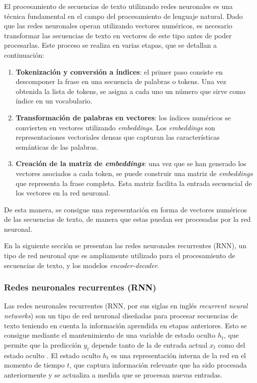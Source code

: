 \documentclass[11pt,spanish,listoffigures,listoftables]{tfgetsinf}
\begin{document}

El procesamiento de secuencias de texto utilizando redes neuronales es una técnica fundamental en el campo del procesamiento de lenguaje natural. Dado que las redes neuronales operan utilizando vectores numéricos, es necesario transformar las secuencias de texto en vectores de este tipo antes de poder procesarlas. Este proceso se realiza en varias etapas, que se detallan a continuación:

\begin{enumerate}
	\item \textbf{Tokenización y conversión a índices}: el primer paso consiste en descomponer la frase en una secuencia de palabras o tokens. Una vez obtenida la lista de tokens, se asigna a cada uno un número que sirve como índice en un vocabulario.
	\item \textbf{Transformación de palabras en vectores}: los índices numéricos se convierten en vectores utilizando \textit{embeddings}. Los \textit{embeddings} son representaciones vectoriales densas que capturan las características semánticas de las palabras.
	\item \textbf{Creación de la matriz de \textit{embeddings}}: una vez que se han generado los vectores asociados a cada token, se puede construir una matriz de \textit{embeddings} que representa la frase completa. Esta matriz facilita la entrada secuencial de los vectores en la red neuronal.
\end{enumerate}

De esta manera, se consigue una representación en forma de vectores numéricos de las secuencias de texto, de manera que estas puedan ser procesadas por la red neuronal.

En la siguiente sección se presentan las redes neuronales recurrentes (RNN), un tipo de red neuronal que es ampliamente utilizado para el procesamiento de secuencias de texto, y los modelos \textit{encoder-decoder}.

\subsubsection{Redes neuronales recurrentes (RNN)} \label{rnn}
Las redes neuronales recurrentes (RNN, por sus siglas en inglés \textit{recurrent neural networks}) son un tipo de red neuronal diseñadas para procesar secuencias de texto teniendo en cuenta la información aprendida en etapas anteriores. Esto se consigue mediante el mantenimiento de una variable de estado oculto $h_t$, que permite que la predicción $y_t$ depende tanto de la de entrada actual $x_t$ como del estado oculto \cite{murphy2022probabilistic}. El estado oculto $h_t$ es una representación interna de la red en el momento de tiempo $t$, que captura información relevante que ha sido procesada anteriormente y se actualiza a medida que se procesan nuevas entradas.
\end{document}
